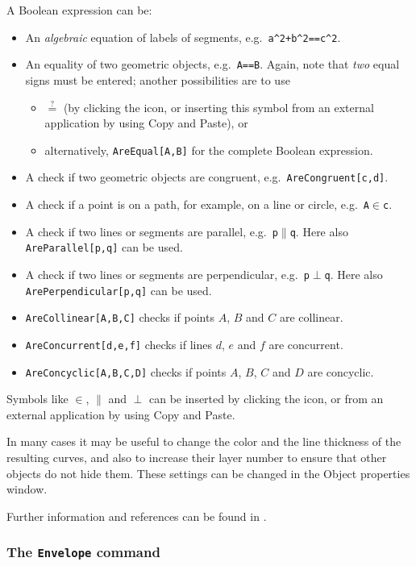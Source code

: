 \documentclass{article}
\begin{document}
A Boolean expression can be:
\begin{itemize}
\item An \textit{algebraic} equation of labels of segments, e.g.~\texttt{a\^{}2+b\^{}2==c\^{}2}.
\item An equality of two geometric objects, e.g.~\texttt{A==B}. Again, note that \textit{two} equal signs must be entered; another possibilities are to use
\begin{itemize}
    \item $\stackrel{?}{=}$ (by clicking the \framebox{$\alpha$} icon, or inserting this symbol from an external application by using Copy and Paste), or
    \item alternatively, \texttt{AreEqual[A,B]} for the complete Boolean expression.
\end{itemize}
\item A check if two geometric objects are congruent, e.g.~\texttt{AreCongruent[c,d]}.
\item A check if a point is on a path, for example, on a line or circle, e.g.~\texttt{A$\in$c}.
\item A check if two lines or segments are parallel, e.g.~\texttt{p$\parallel$q}. Here also \texttt{AreParallel[p,q]} can be used.
\item A check if two lines or segments are perpendicular, e.g.~\texttt{p$\perp$q}. Here also \texttt{ArePerpendicular[p,q]} can be used.
\item \texttt{AreCollinear[A,B,C]} checks if points $A$, $B$ and $C$ are collinear.
\item \texttt{AreConcurrent[d,e,f]} checks if lines $d$, $e$ and $f$ are concurrent.
\item \texttt{AreConcyclic[A,B,C,D]} checks if points $A$, $B$, $C$ and $D$ are concyclic.
\end{itemize}
Symbols like $\in$, $\parallel$ and $\perp$ can be inserted by clicking the \framebox{$\alpha$} icon, or from an external application by using Copy and Paste.

In many cases it may be useful to change the color and the line thickness of the resulting curves, and also to increase their layer number to ensure that other objects do not hide them. These settings can be changed in the Object properties window.

Further information and references can be found in \cite{AbanadesBotanaKovacsRecioSolyomGecse}.

\subsubsection{The \texttt{Envelope} command}
\end{document}
